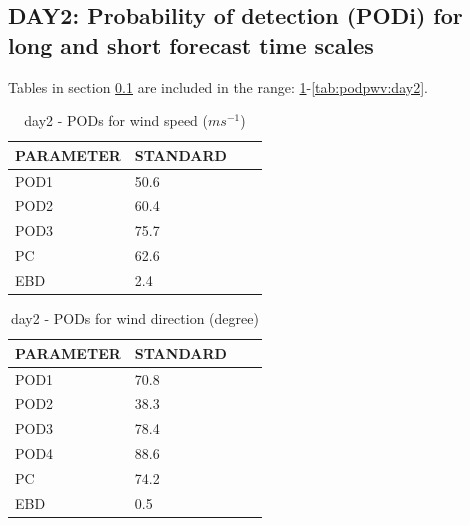 \subsection{DAY2: Probability of detection (PODi) for long and short forecast time scales}\label{subsec:day2:pod}
Tables in section \ref{subsec:day2:pod} are included in the range: \ref{tab:podws:day2}-\ref{tab:podpwv:day2}.
\begin{table}[h!]
\begin{center}
\begin{tabular}{|l|l|l|l|}
\hline
\multicolumn{1}{|c|}{\cellcolor[HTML]{C0C0C0}\textbf{PARAMETER}} & \multicolumn{1}{c|}{\cellcolor[HTML]{C0C0C0}\textbf{STANDARD}} \\
\hline
\cellcolor[HTML]{C0C0C0}POD1  & 50.6                                \\
\cellcolor[HTML]{C0C0C0}POD2  & 60.4                                \\
\cellcolor[HTML]{C0C0C0}POD3  & 75.7                                \\
\cellcolor[HTML]{C0C0C0}PC    & 62.6                                  \\
\cellcolor[HTML]{C0C0C0}EBD   & 2.4                                 \\
\hline
\end{tabular}
\caption{day2 - PODs for wind speed ($m s^{-1}$)}
\label{tab:podws:day2}
\end{center}
\end{table}
\begin{table}[p!]
\begin{center}
\begin{tabular}{|l|l|l|l|}
\hline
\multicolumn{1}{|c|}{\cellcolor[HTML]{C0C0C0}\textbf{PARAMETER}} & \multicolumn{1}{c|}{\cellcolor[HTML]{C0C0C0}\textbf{STANDARD}}\\
\hline
\cellcolor[HTML]{C0C0C0}POD1  & 70.8      \\
\cellcolor[HTML]{C0C0C0}POD2  & 38.3      \\
\cellcolor[HTML]{C0C0C0}POD3  & 78.4      \\
\cellcolor[HTML]{C0C0C0}POD4  & 88.6      \\
\cellcolor[HTML]{C0C0C0}PC    & 74.2        \\
\cellcolor[HTML]{C0C0C0}EBD   & 0.5       \\
\hline
\end{tabular}
\caption{day2 - PODs for wind direction (degree)}
\label{tab:podwd:day2}
\end{center}
\end{table}
